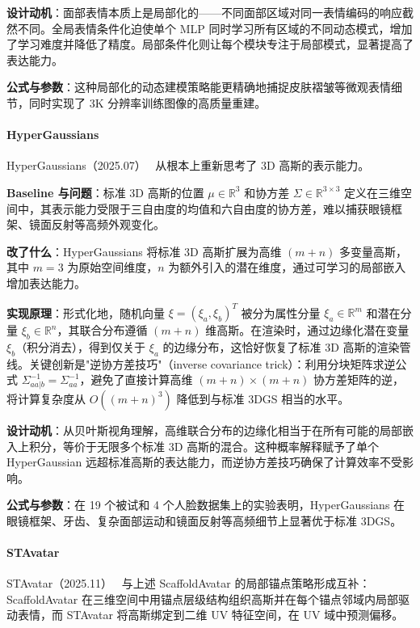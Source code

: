 \textbf{设计动机}：面部表情本质上是局部化的——不同面部区域对同一表情编码的响应截然不同。全局表情条件化迫使单个 MLP 同时学习所有区域的不同动态模式，增加了学习难度并降低了精度。局部条件化则让每个模块专注于局部模式，显著提高了表达能力。

\textbf{公式与参数}：这种局部化的动态建模策略能更精确地捕捉皮肤褶皱等微观表情细节，同时实现了 3K 分辨率训练图像的高质量重建。

\paragraph{HyperGaussians}

HyperGaussians（2025.07）~\cite{2507_02803} 从根本上重新思考了 3D 高斯的表示能力。

\textbf{Baseline 与问题}：标准 3D 高斯的位置 $\mu \in \mathbb{R}^3$ 和协方差 $\Sigma \in \mathbb{R}^{3\times 3}$ 定义在三维空间中，其表示能力受限于三自由度的均值和六自由度的协方差，难以捕获眼镜框架、镜面反射等高频外观变化。

\textbf{改了什么}：HyperGaussians 将标准 3D 高斯扩展为高维 $(m+n)$ 多变量高斯，其中 $m=3$ 为原始空间维度，$n$ 为额外引入的潜在维度，通过可学习的局部嵌入增加表达能力。

\textbf{实现原理}：形式化地，随机向量 $\xi = (\xi_a, \xi_b)^T$ 被分为属性分量 $\xi_a \in \mathbb{R}^m$ 和潜在分量 $\xi_b \in \mathbb{R}^n$，其联合分布遵循 $(m+n)$ 维高斯。在渲染时，通过边缘化潜在变量 $\xi_b$（积分消去），得到仅关于 $\xi_a$ 的边缘分布，这恰好恢复了标准 3D 高斯的渲染管线。关键创新是"逆协方差技巧"（inverse covariance trick）：利用分块矩阵求逆公式 $\Sigma^{-1}_{aa|b} = \Sigma^{-1}_{aa}$，避免了直接计算高维 $(m+n)\times(m+n)$ 协方差矩阵的逆，将计算复杂度从 $O((m+n)^3)$ 降低到与标准 3DGS 相当的水平。

\textbf{设计动机}：从贝叶斯视角理解，高维联合分布的边缘化相当于在所有可能的局部嵌入上积分，等价于无限多个标准 3D 高斯的混合。这种概率解释赋予了单个 HyperGaussian 远超标准高斯的表达能力，而逆协方差技巧确保了计算效率不受影响。

\textbf{公式与参数}：在 19 个被试和 4 个人脸数据集上的实验表明，HyperGaussians 在眼镜框架、牙齿、复杂面部运动和镜面反射等高频细节上显著优于标准 3DGS。

\paragraph{STAvatar}

STAvatar（2025.11）~\cite{2511_19854} 与上述 ScaffoldAvatar 的局部锚点策略形成互补：ScaffoldAvatar 在三维空间中用锚点层级结构组织高斯并在每个锚点邻域内局部驱动表情，而 STAvatar 将高斯绑定到二维 UV 特征空间，在 UV 域中预测偏移。

